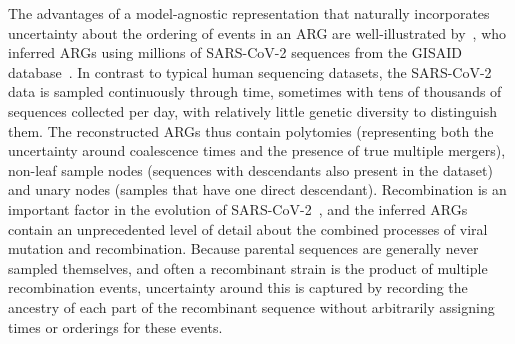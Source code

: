 \documentclass{article}
\begin{document}
The advantages of a model-agnostic representation that naturally
incorporates uncertainty about the ordering of events in an ARG
are well-illustrated by~\cite{zhan2023towards}, who
inferred ARGs using millions of SARS-CoV-2 sequences from the
GISAID database~\citep{shu2017gisaid}.
In contrast to typical human sequencing datasets, the SARS-CoV-2 data is
sampled continuously through time, sometimes with tens of thousands of sequences collected per day, with relatively little genetic diversity to
distinguish them. The reconstructed ARGs thus contain polytomies (representing
both the uncertainty around coalescence times and the presence of true
multiple mergers), non-leaf sample nodes (sequences with descendants
also present in the dataset) and unary nodes (samples that have
one direct descendant).
Recombination is an important factor in the evolution of
SARS-CoV-2~\citep{vaninsberghe2021recombinant,jackson2021generation,ignatieva2022ongoing},
and the inferred ARGs contain an unprecedented level of detail about
the combined processes of viral mutation and recombination.
Because parental sequences
are generally never sampled themselves, and often
a recombinant strain is the product of multiple recombination events,
uncertainty around this is captured by recording the ancestry
of each part of the recombinant sequence without arbitrarily assigning
times or orderings for these events.
\end{document}
